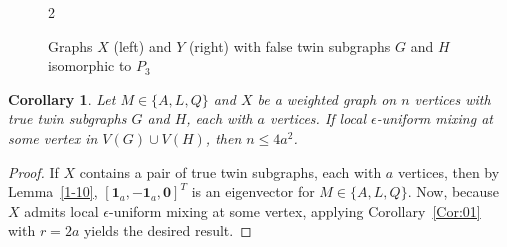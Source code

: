 \documentclass[11pt]{article}
\newtheorem{corollary}{Corollary}
\newcommand{\one}{\mathbf 1}
\newcommand{\zero}{\mathbf 0}
\begin{document}
\begin{figure}
\begin{multicols}{2}
\begin{center}
				
\end{center}
\end{multicols}
\caption{\label{fii} Graphs $X$ (left) and $Y$ (right) with false twin subgraphs $G$ and $H$ isomorphic to $P_3$}
\end{figure}

\begin{corollary}
\label{twinsubg}
Let $M\in\{A,L,Q\}$ and $X$ be a weighted graph on $n$ vertices with true twin subgraphs $G$ and $H$, each with $a$ vertices. If local $\epsilon$-uniform mixing at some vertex in $V(G)\cup V(H)$, then $n\leq 4a^2$.
\end{corollary}

\begin{proof}
If $X$ contains a pair of true twin subgraphs, each with $a$ vertices, then by Lemma~\ref{1-10}, $[\one_a ,-\one_a ,\zero]^T$ is an eigenvector for $M\in\{A,L,Q\}$. Now, because $X$ admits local $\epsilon$-uniform mixing at some vertex, applying Corollary~\ref{Cor:01} with $r=2a$ yields the desired result.    
\end{proof}
\end{document}
